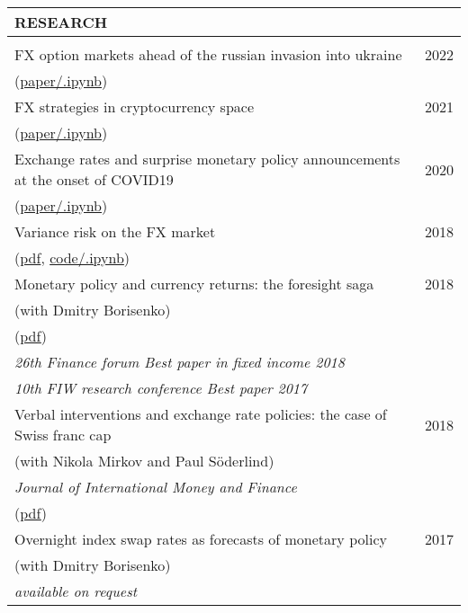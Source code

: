 \documentclass[a4paper,11pt,oneside]{article}
\begin{document}
\begin{tabularx}{\textwidth}{L r}
    RESEARCH & \\
    \midrule \\[-10pt]

    FX option markets ahead of the russian invasion into ukraine & 2022 \\
    (\href{https://github.com/ipozdeev/fx-options-ukraine-war}{paper/.ipynb}) & \\[6pt]

    FX strategies in cryptocurrency space & 2021 \\
    (\href{https://github.com/ipozdeev/crypto-fx-strategies}{paper/.ipynb}) & \\[6pt]

    Exchange rates and surprise monetary policy announcements at the onset of COVID19 & 2020 \\
    (\href{https://github.com/ipozdeev/mp-fx-covid19}{paper/.ipynb}) & \\[6pt]

    Variance risk on the FX market & 2018 \\
    (\href{http://igorpozdeev.me/files/pozdeev_2018_fx_variance.pdf}{pdf}, 
    \href{https://github.com/ipozdeev/variance-risk-fx-markets}{code/.ipynb}) & \\[6pt]

    Monetary policy and currency returns: the foresight saga & 2018 \\
    (with Dmitry Borisenko) & \\
    (\href{https://ssrn.com/abstract=2983043}{pdf}) \\
    \textit{26th Finance forum Best paper in fixed income 2018} \\ 
    \textit{10th FIW research conference Best paper 2017} \\[6pt]

    Verbal interventions and exchange rate policies: the case of Swiss franc cap & 2018 \\
    (with Nikola Mirkov and Paul S\"oderlind) & \\
    \textit{Journal of International Money and Finance} & \\
    (\href{https://ssrn.com/abstract=2804570}{pdf}) & \\[6pt]

    Overnight index swap rates as forecasts of monetary policy & 2017 \\
    (with Dmitry Borisenko) & \\ 
    \textit{available on request} & \\
       
\end{tabularx}
\end{document}
